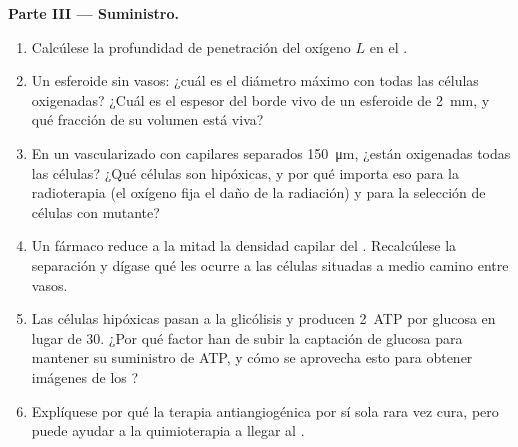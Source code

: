 \begin{problem}
\medskip
\noindent\textbf{Parte III --- Suministro.}
\begin{enumerate}[resume]
  \item Calcúlese la profundidad de penetración del oxígeno $L$ en el
        .
  \item Un esferoide sin vasos: ¿cuál es el diámetro máximo con todas
        las células oxigenadas? ¿Cuál es el espesor del borde vivo de un
        esferoide de \qty{2}{mm}, y qué fracción de su volumen está
        viva?
  \item En un  vascularizado con capilares separados
        \qty{150}{\micro m}, ¿están oxigenadas todas las células? ¿Qué
        células son hipóxicas, y por qué importa eso para la
        radioterapia (el oxígeno fija el daño de la radiación) y para la
        selección de células con  mutante?
  \item Un fármaco reduce a la mitad la densidad capilar del .
        Recalcúlese la separación y dígase qué les ocurre a las células
        situadas a medio camino entre vasos.
  \item Las células hipóxicas pasan a la glicólisis y producen
        \qty{2}{ATP} por glucosa en lugar de $30$. ¿Por qué factor han de
        subir la captación de glucosa para mantener su suministro de ATP,
        y cómo se aprovecha esto para obtener imágenes de los ?
  \item Explíquese por qué la terapia antiangiogénica por sí sola rara
        vez cura, pero puede ayudar a la quimioterapia a llegar al .
\end{enumerate}


\end{problem}
